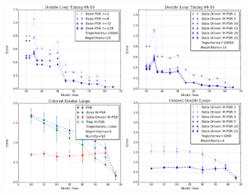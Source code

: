 \documentclass[letterpaper]{article}
\begin{document}
%


\begin{figure}[t!]
\centering
\includegraphics[width=44mm]{basePows.png}%
%
\includegraphics[width=44mm]{NumOpsTiming.png}%
\includegraphics[width=44mm]{MO_1k.png}%
%
\includegraphics[width=44mm]{numOpComparison.png}%

\end{figure}
\end{document}

